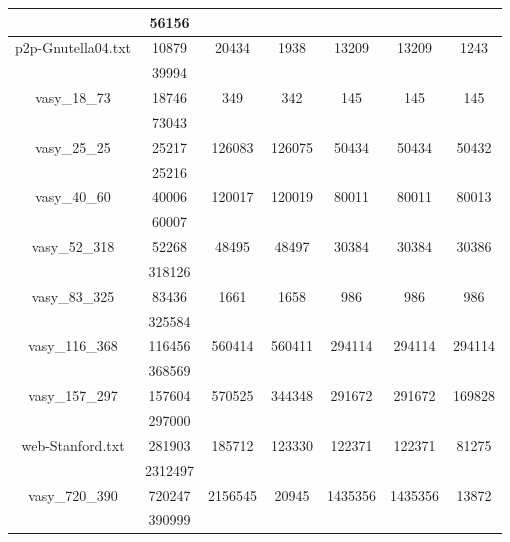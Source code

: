 \documentclass[../master/master.tex]{subfiles}
\begin{document}
\begin{center}
\begin{tabular}{ |c|c||c||c||c||c||c|| }
\cline{2-2}
 & 56156  & & & & & \\
\hline
\multirow{2}{3.8em}{p2p-Gnutella04.txt} & 10879 & \multirow{2}{3.8em}{20434} & \multirow{2}{3.8em}{1938} & \multirow{2}{3.8em}{13209} & \multirow{2}{3.8em}{13209} & \multirow{2}{3.8em}{1243} \\
\cline{2-2}
 & 39994  & & & & & \\
\hline
\multirow{2}{3.8em}{vasy\_18\_73} & 18746 & \multirow{2}{3.8em}{349} & \multirow{2}{3.8em}{342} & \multirow{2}{3.8em}{145} & \multirow{2}{3.8em}{145} & \multirow{2}{3.8em}{145} \\
\cline{2-2}
 & 73043  & & & & & \\
\hline
\multirow{2}{3.8em}{vasy\_25\_25} & 25217 & \multirow{2}{3.8em}{126083} & \multirow{2}{3.8em}{126075} & \multirow{2}{3.8em}{50434} & \multirow{2}{3.8em}{50434} & \multirow{2}{3.8em}{50432} \\
\cline{2-2}
 & 25216  & & & & & \\
\hline
\multirow{2}{3.8em}{vasy\_40\_60} & 40006 & \multirow{2}{3.8em}{120017} & \multirow{2}{3.8em}{120019} & \multirow{2}{3.8em}{80011} & \multirow{2}{3.8em}{80011} & \multirow{2}{3.8em}{80013} \\
\cline{2-2}
 & 60007  & & & & & \\
\hline
\multirow{2}{3.8em}{vasy\_52\_318} & 52268 & \multirow{2}{3.8em}{48495} & \multirow{2}{3.8em}{48497} & \multirow{2}{3.8em}{30384} & \multirow{2}{3.8em}{30384} & \multirow{2}{3.8em}{30386} \\
\cline{2-2}
 & 318126  & & & & & \\
\hline
\multirow{2}{3.8em}{vasy\_83\_325} & 83436 & \multirow{2}{3.8em}{1661} & \multirow{2}{3.8em}{1658} & \multirow{2}{3.8em}{986} & \multirow{2}{3.8em}{986} & \multirow{2}{3.8em}{986} \\
\cline{2-2}
 & 325584  & & & & & \\
\hline
\multirow{2}{3.8em}{vasy\_116\_368} & 116456 & \multirow{2}{3.8em}{560414} & \multirow{2}{3.8em}{560411} & \multirow{2}{3.8em}{294114} & \multirow{2}{3.8em}{294114} & \multirow{2}{3.8em}{294114} \\
\cline{2-2}
 & 368569  & & & & & \\
\hline
\multirow{2}{3.8em}{vasy\_157\_297} & 157604 & \multirow{2}{3.8em}{570525} & \multirow{2}{3.8em}{344348} & \multirow{2}{3.8em}{291672} & \multirow{2}{3.8em}{291672} & \multirow{2}{3.8em}{169828} \\
\cline{2-2}
 & 297000  & & & & & \\
\hline
\multirow{2}{3.8em}{web-Stanford.txt} & 281903 & \multirow{2}{3.8em}{185712} & \multirow{2}{3.8em}{123330} & \multirow{2}{3.8em}{122371} & \multirow{2}{3.8em}{122371} & \multirow{2}{3.8em}{81275} \\
\cline{2-2}
 & 2312497  & & & & & \\
\hline
\multirow{2}{3.8em}{vasy\_720\_390} & 720247 & \multirow{2}{3.8em}{2156545} & \multirow{2}{3.8em}{20945} & \multirow{2}{3.8em}{1435356} & \multirow{2}{3.8em}{1435356} & \multirow{2}{3.8em}{13872} \\
\cline{2-2}
 & 390999  & & & & & \\
\hline
\end{tabular}
\end{center}
\end{document}
